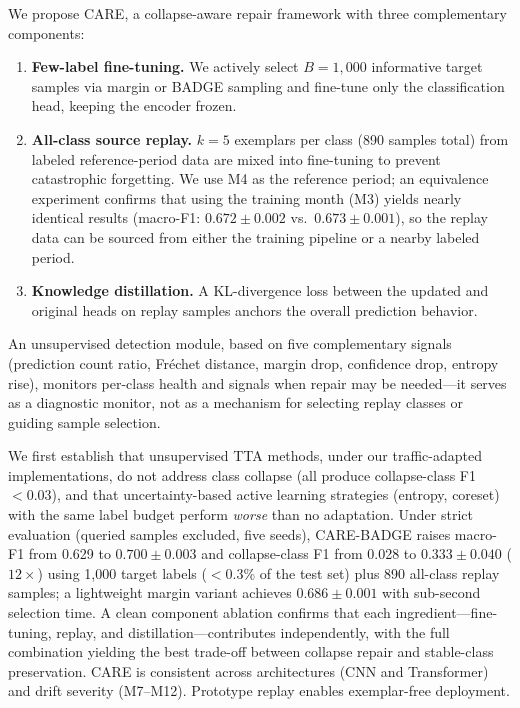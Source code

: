 \documentclass[journal]{IEEEtran}
\newcommand{\ours}{CARE}  %
\begin{document}
We propose \ours{}, a collapse-aware repair framework with three complementary components:
\begin{enumerate}
  \item \textbf{Few-label fine-tuning.} We actively select $B{=}1{,}000$ informative target samples via margin or BADGE sampling and fine-tune only the classification head, keeping the encoder frozen.
  \item \textbf{All-class source replay.} $k{=}5$ exemplars per class (890 samples total) from labeled reference-period data are mixed into fine-tuning to prevent catastrophic forgetting. We use M4 as the reference period; an equivalence experiment confirms that using the training month (M3) yields nearly identical results (macro-F1: $0.672{\pm}0.002$ vs.\ $0.673{\pm}0.001$), so the replay data can be sourced from either the training pipeline or a nearby labeled period.
  \item \textbf{Knowledge distillation.} A KL-divergence loss between the updated and original heads on replay samples anchors the overall prediction behavior.
\end{enumerate}
An unsupervised detection module, based on five complementary signals (prediction count ratio, Fr\'{e}chet distance, margin drop, confidence drop, entropy rise), monitors per-class health and signals when repair may be needed---it serves as a diagnostic monitor, not as a mechanism for selecting replay classes or guiding sample selection.

We first establish that unsupervised TTA methods, under our traffic-adapted implementations, do not address class collapse (all produce collapse-class F1 ${<}0.03$), and that uncertainty-based active learning strategies (entropy, coreset) with the same label budget perform \textit{worse} than no adaptation.
Under strict evaluation (queried samples excluded, five seeds), \ours{}-BADGE raises macro-F1 from 0.629 to $0.700{\pm}0.003$ and collapse-class F1 from 0.028 to $0.333{\pm}0.040$ ($12{\times}$) using 1{,}000 target labels ($<$0.3\% of the test set) plus 890 all-class replay samples; a lightweight margin variant achieves $0.686{\pm}0.001$ with sub-second selection time.
A clean component ablation confirms that each ingredient---fine-tuning, replay, and distillation---contributes independently, with the full combination yielding the best trade-off between collapse repair and stable-class preservation.
\ours{} is consistent across architectures (CNN and Transformer) and drift severity (M7--M12). Prototype replay enables exemplar-free deployment.
\end{document}

